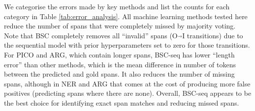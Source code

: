 We categorise the errors made by key methods and list the
counts for each category in Table \ref{tab:error_analysis}.
All machine learning methods tested here reduce the number of spans that were completely missed by majority voting. Note that BSC completely removes all ``invalid'' spans
(O$\Arrow{0.2cm}$I transitions) due to the sequential model with prior hyperparameters set
to zero for those transitions.
For PICO and ARG, which contain longer spans,
BSC-seq has lower ``length error'' than other methods,
 which is the mean difference in number of tokens between the predicted and gold spans. 
 It also reduces the number of missing spans, although in NER and ARG that comes at the cost of producing more false positives (predicting spans where there are none).
Overall, BSC-seq appears to be the best choice for identifying 
exact span matches and reducing missed spans.



